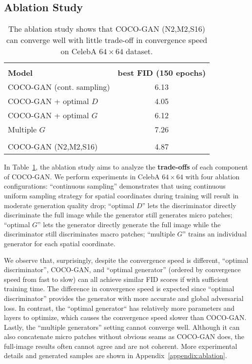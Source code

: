 \documentclass{article}
\newcommand{\modelName}{COCO-GAN }
\newcommand{\modelNamePunc}{COCO-GAN}
\begin{document}
    \subsection{Ablation Study}
        \label{exp:ablation-study}
        
        \begin{table}
            \small
            \centering
\begin{tabular}{l c}
                \toprule \\ [-1.2em]
                \textbf{Model} & \textbf{best FID (150 epochs)} \\ [0.1em]
                \hline
                \modelName (cont. sampling)      & 6.13 \\
                \modelName + optimal $D$         & 4.05 \\
                \modelName + optimal $G$         & 6.12 \\
                Multiple $G$                     & 7.26 \\
                \hline \\ [-0.9em]
                \modelName (N2,M2,S16)           & 4.87 \\
                \bottomrule
            \end{tabular}
\caption{The ablation study shows that \modelName (N2,M2,S16) can converge well with little trade-off in convergence speed on CelebA $64\times64$ dataset.}
            \label{table:ablation}
            \vspace{-1em}
        \end{table}
        
        In Table~\ref{table:ablation}, the ablation study aims to analyze the \textbf{trade-offs} of each component of \modelNamePunc. We perform experiments in CelebA $64\times 64$ with four ablation configurations: ``continuous sampling'' demonstrates that using continuous uniform sampling strategy for spatial coordinates during training will result in moderate generation quality drop; ``optimal $D$'' lets the discriminator directly discriminate the full image while the generator still generates micro patches; ``optimal $G$'' lets the generator directly generate the full image while the discriminator still discriminates macro patches; ``multiple $G$'' trains an individual generator for each spatial coordinate. 
        
        We observe that, surprisingly, despite the convergence speed is different, ``optimal discriminator'', \modelNamePunc, and ``optimal generator'' (ordered by convergence speed from fast to slow) can all achieve similar FID scores if with sufficient training time. The difference in convergence speed is expected since ``optimal discriminator'' provides the generator with more accurate and global adversarial loss. In contrast, the ``optimal generator`` has relatively more parameters and layers to optimize, which causes the convergence speed slower than \modelNamePunc. Lastly, the ``multiple generators'' setting cannot converge well. Although it can also concatenate micro patches without obvious seams as \modelName does, the full-image results often cannot agree and are not coherent. More experimental details and generated samples are shown in Appendix~\ref{appendix:ablation}.
        
\end{document}
